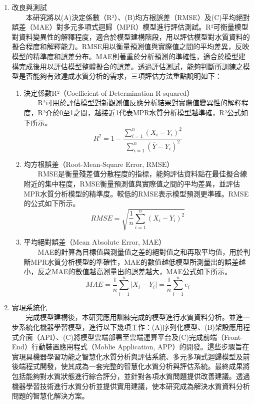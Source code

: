 \documentclass[12pt,a4paper]{article}
\begin{document}
\begin{enumerate}
\begin{enumerate}[label=\arabic*.]
\begin{enumerate}[label=2-2-\arabic*.]
        \item 改良與測試\\
        　　本研究將以(A)決定係數（R²）、(B)均方根誤差（RMSE）及(C)平均絕對誤差（MAE）對多元多項式迴歸（MPR）模型進行評估測試。R²可衡量模型對資料變異性的解釋程度，適合於模型建構階段，用以評估模型對水質資料的擬合程度和解釋能力。RMSE用以衡量預測值與實際值之間的平均差異，反映模型的精準度和誤差分布。MAE則著重於分析預測的準確性，適合於模型建構完成後用以評估模型整體擬合的誤差。透過評估測試，能夠判斷所訓練之模型是否能夠有效達成水質分析的需求，三項評估方法重點說明如下：
            \begin{enumerate}[label=\Alph*.]
                \item 決定係數R²（Coefficient of Determination R-squared）\\
                　　R²可用於評估模型對新觀測值反應分析結果對實際值變異性的解釋程度，R²介於0至1之間，越接近1代表MPR水質分析模型越準確，R²公式如下所示。
                    \begin{equation}
                    R^2 = 1 - \frac{\sum_{i=1}^n (X_i - Y_i)^2}{\sum_{i=1}^n (\overline{Y} - Y_i)^2}
                    \end{equation}
                \item 均方根誤差（Root-Mean-Square Error, RMSE）\\
                　　RMSE是衡量殘差值分散程度的指標，能夠評估資料點在最佳擬合線附近的集中程度，RMSE衡量預測值與實際值之間的平均差異，並評估MPR水質分析模型的精準度。較低的RMSE表示模型預測更準確。RMSE的公式如下所示。
                    \begin{equation}
                    RMSE = \sqrt{\frac{1}{n} \sum_{i=1}^n (X_i - Y_i)^2}
                    \end{equation}
                \item 平均絕對誤差（Mean Absolute Error, MAE）\\
                　　MAE的計算為目標值與測量值之差的絕對值之和再取平均值，用於判斷MPR水質分析模型的準確性，MAE的數值越低模型所測量出的誤差越小，反之MAE的數值越高測量出的誤差越大，MAE公式如下所示。
                    \begin{equation}
                    MAE = \frac{1}{n} \sum_{i=1}^n |X_i - Y_i| = \frac{1}{n} \sum_{i=1}^n e_i
                    \end{equation}
            \end{enumerate}
        \item 實現系統化\\
        　　完成模型建構後，本研究應用訓練完成的模型進行水質資料分析。並進一步系統化機器學習模型，進行以下幾項工作：(A)序列化模型、(B)架設應用程式介面（API）、(C)將模型雲端部署至雲端運算平台及(C)完成前端（Front-End）行動裝置應用程式（Moblie Application, APP）的開發。這些步驟旨在實現具機器學習功能之智慧化水質分析與評估系統、多元多項式迴歸模型及前後端程式開發，使其成為一套完整的智慧化水質分析與評估系統。最終成果將包括能夠對水質狀態進行綜合評分，並針對各項水質問題提供改善建議。透過機器學習技術進行水質分析並提供實用建議，使本研究成為解決水質資料分析問題的智慧化解決方案。

\end{enumerate}
\end{enumerate}
\end{enumerate}
\end{document}
